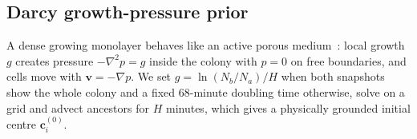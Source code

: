 \subsection{Darcy growth-pressure prior}
\label{sec:darcy}
A dense growing monolayer behaves like an active porous medium~\cite{volfson2008biomechanical,delarue2016selfdriven}: local growth $g$ creates pressure $-\nabla^2 p=g$ inside the colony with $p{=}0$ on free boundaries, and cells move with $\mathbf{v}=-\nabla p$.
We set $g{=}\ln(N_b/N_a)/H$ when both snapshots show the whole colony and a fixed 68-minute doubling time otherwise, solve on a grid and advect ancestors for $H$ minutes, which gives a physically grounded initial centre $\mathbf{c}_i^{(0)}$.
